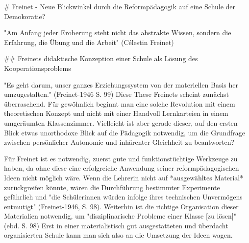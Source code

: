 # Freinet - Neue Blickwinkel durch die Reformpädagogik auf eine Schule der Demokoratie?

"Am Anfang jeder Eroberung steht nicht das abstrakte Wissen, sondern die Erfahrung, die Übung und die Arbeit" (Célestin Freinet)

## Freinets didaktische Konzeption einer Schule als Lösung des Kooperationsproblems

"Es geht darum, unser ganzes Erziehungssystem von der materiellen Basis her umzugestalten." (Freinet-1946 S. 99)
Diese These Freinets scheint zunächst überraschend.
Für gewöhnlich beginnt man eine solche Revolution mit einem theoretischen Konzept und nicht mit einer Handvoll Lernkarteien in einem umgeräumten Klassenzimmer.
Vielleicht ist aber gerade dieser, auf den ersten Blick etwas unorthodoxe Blick auf die Pädagogik notwendig, um die Grundfrage zwischen persönlicher Autonomie und inhärenter Gleichheit zu beantworten?

Für Freinet ist es notwendig, zuerst gute und funktionstüchtige Werkzeuge zu haben, da ohne diese eine erfolgreiche Anwendung seiner reformpädagogischen Ideen nicht möglich wäre.
Wenn die Lehrerin nicht auf *ausgewähltes Material* zurückgreifen könnte, wären die Durchführung bestimmter Experimente gefährlich und "die Schülerinnen würden infolge ihres technischen Unvermögens entmutigt" (Freinet-1946, S. 98).
Weiterhin ist die richtige Organisation dieser Materialien notwendig, um "disziplinarische Probleme einer Klasse [zu lösen]" (ebd. S. 98)
Erst in einer materialistisch gut ausgestatteten und überdacht organisierten Schule kann man sich also an die Umsetzung der Ideen wagen.

